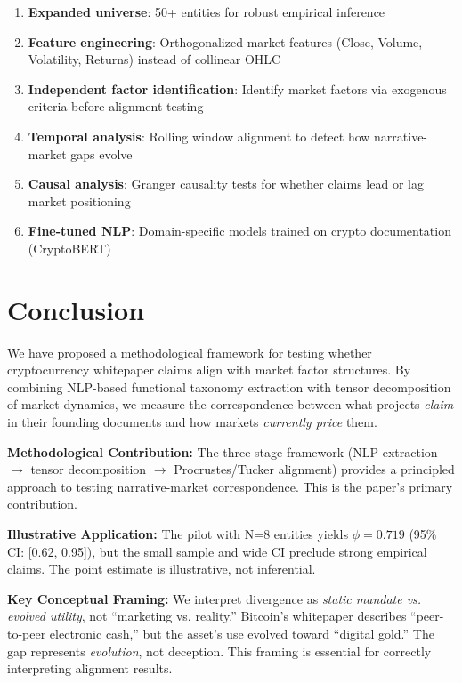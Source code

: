 \documentclass[11pt,twocolumn]{article}
\begin{document}
\begin{enumerate}[leftmargin=*]
    \item \textbf{Expanded universe}: 50+ entities for robust empirical inference
    \item \textbf{Feature engineering}: Orthogonalized market features (Close, Volume, Volatility, Returns) instead of collinear OHLC
    \item \textbf{Independent factor identification}: Identify market factors via exogenous criteria before alignment testing
    \item \textbf{Temporal analysis}: Rolling window alignment to detect how narrative-market gaps evolve
    \item \textbf{Causal analysis}: Granger causality tests for whether claims lead or lag market positioning
    \item \textbf{Fine-tuned NLP}: Domain-specific models trained on crypto documentation (CryptoBERT)
\end{enumerate}

\section{Conclusion}
\label{sec:conclusion}

We have proposed a methodological framework for testing whether cryptocurrency whitepaper claims align with market factor structures. By combining NLP-based functional taxonomy extraction with tensor decomposition of market dynamics, we measure the correspondence between what projects \textit{claim} in their founding documents and how markets \textit{currently price} them.

\textbf{Methodological Contribution:} The three-stage framework (NLP extraction $\rightarrow$ tensor decomposition $\rightarrow$ Procrustes/Tucker alignment) provides a principled approach to testing narrative-market correspondence. This is the paper's primary contribution.

\textbf{Illustrative Application:} The pilot with N=8 entities yields $\phi = 0.719$ (95\% CI: [0.62, 0.95]), but the small sample and wide CI preclude strong empirical claims. The point estimate is illustrative, not inferential.

\textbf{Key Conceptual Framing:} We interpret divergence as \textit{static mandate vs. evolved utility}, not ``marketing vs. reality.'' Bitcoin's whitepaper describes ``peer-to-peer electronic cash,'' but the asset's use evolved toward ``digital gold.'' The gap represents \textit{evolution}, not deception. This framing is essential for correctly interpreting alignment results.
\end{document}

